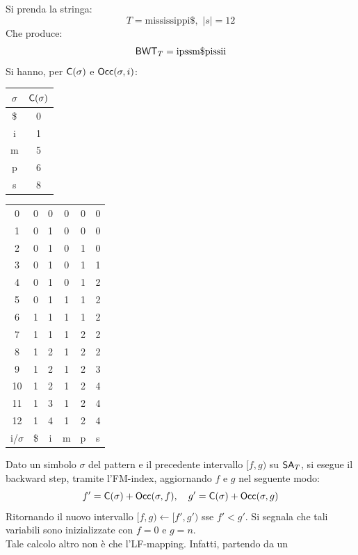 \begin{esempio}
  Si prenda la stringa:
  \[T=\mbox{mississippi\$},\,\,|s|=12\]
  Che produce:
  \[\mbox{\rm {\sf BWT}}_T=\mbox{ipssm\$pissii}\]
  Si hanno, per $\mbox{\rm {\sf C}}(\sigma)$ e $\mbox{\rm {\sf Occ}}(\sigma, i)$:
  \begin{table}[H]
    \centering
    \begin{tabular}{c||c}
      $\sigma$ & $\mbox{\rm {\sf C}}(\sigma)$\\
      \hline
      \hline
      \$ & 0\\
      i & 1 \\
      m & 5\\
      p & 6\\
      s & 8\\
    \end{tabular}\quad\quad\quad\quad\quad
    \begin{tabular}{c||c|c|c|c|c}
      0 & 0 & 0 & 0 & 0 & 0 \\
      1 & 0 & 1 & 0 & 0 & 0 \\
      2 & 0 & 1 & 0 & 1 & 0 \\
      3 & 0 & 1 & 0 & 1 & 1 \\
      4 & 0 & 1 & 0 & 1 & 2 \\
      5 & 0 & 1 & 1 & 1 & 2 \\
      6 & 1 & 1 & 1 & 1 & 2 \\
      7 & 1 & 1 & 1 & 2 & 2 \\
      8 & 1 & 2 & 1 & 2 & 2 \\
      9 & 1 & 2 & 1 & 2 & 3 \\
      10 & 1 & 2 & 1 & 2 & 4 \\
      11 & 1 & 3 & 1 & 2 & 4 \\
      12 & 1 & 4 & 1 & 2 & 4 \\
      \hline
      \hline
      i/$\sigma$ & \$ & i & m & p & s
    \end{tabular}
  \end{table}
\end{esempio}
Dato un simbolo $\sigma$ del pattern e il precedente intervallo $[f,g)$ su
$\mbox{\rm {\sf SA}}_T$, si esegue il backward step, tramite l'FM-index,
aggiornando $f$ e $g$ nel seguente modo: 
\begin{equation}
  \label{eq:bwt6}
  f'=\mbox{\rm {\sf C}}(\sigma)+\mbox{\rm {\sf Occ}}(\sigma, f),\quad g'=\mbox{\rm {\sf C}}(\sigma)+\mbox{\rm {\sf Occ}}(\sigma, g)
\end{equation}
Ritornando il nuovo intervallo $[f, g)\gets [f', g')$ sse $f'< g'$.
Si segnala che tali variabili sono inizializzate con $f=0$ e $g=n$.\\
Tale calcolo altro non è che l'LF-mapping. Infatti, partendo da un
